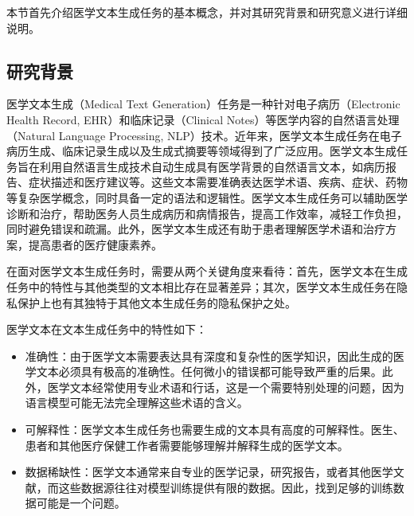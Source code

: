 


本节首先介绍医学文本生成任务的基本概念，并对其研究背景和研究意义进行详细说明。

\subsection{研究背景}

医学文本生成（Medical Text Generation）任务是一种针对电子病历（Electronic Health Record, EHR）和临床记录（Clinical Notes）等医学内容的自然语言处理（Natural Language Processing, NLP）技术。近年来，医学文本生成任务在电子病历生成\cite{EHR_Generation}、临床记录生成\cite{CN_Generation}以及生成式摘要\cite{Medical_Text_Generation_Summary_CN}等领域得到了广泛应用。医学文本生成任务旨在利用自然语言生成技术自动生成具有医学背景的自然语言文本，如病历报告、症状描述和医疗建议等。这些文本需要准确表达医学术语、疾病、症状、药物等复杂医学概念，同时具备一定的语法和逻辑性。医学文本生成任务可以辅助医学诊断和治疗，帮助医务人员生成病历和病情报告，提高工作效率，减轻工作负担，同时避免错误和疏漏。此外，医学文本生成还有助于患者理解医学术语和治疗方案，提高患者的医疗健康素养。


在面对医学文本生成任务时，需要从两个关键角度来看待：首先，医学文本在生成任务中的特性与其他类型的文本相比存在显著差异；其次，医学文本生成任务在隐私保护上也有其独特于其他文本生成任务的隐私保护之处。

医学文本在文本生成任务中的特性如下：
\begin{itemize}

	\item 准确性：由于医学文本需要表达具有深度和复杂性的医学知识，因此生成的医学文本必须具有极高的准确性。任何微小的错误都可能导致严重的后果。此外，医学文本经常使用专业术语和行话，这是一个需要特别处理的问题，因为语言模型可能无法完全理解这些术语的含义。
	\item 可解释性：医学文本生成任务也需要生成的文本具有高度的可解释性。医生、患者和其他医疗保健工作者需要能够理解并解释生成的医学文本。
	\item 数据稀缺性：医学文本通常来自专业的医学记录，研究报告，或者其他医学文献，而这些数据源往往对模型训练提供有限的数据。因此，找到足够的训练数据可能是一个问题。
\end{itemize}

